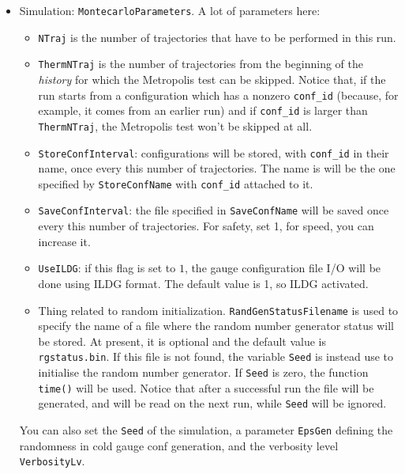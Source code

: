 \begin{itemize}
\item{Simulation: \verb|MontecarloParameters|.} A lot of parameters here: 
\begin{itemize}
\item \verb|NTraj| is the number of trajectories that have to be performed in 
    this run.
\item \verb|ThermNTraj| is the number of trajectories from the beginning of the 
    \emph{history} for which the Metropolis test can be skipped. Notice that, 
if 
    the run starts from a configuration which has a nonzero \verb|conf_id| 
    (because, for example, it comes from an earlier run) and if \verb|conf_id| 
is 
    larger than \verb|ThermNTraj|, the Metropolis test won't be skipped at all.
\item \verb|StoreConfInterval|: configurations will be stored, with 
    \verb|conf_id| in their name, once every this number of trajectories. The 
name 
    is will be the one specified by \verb|StoreConfName| with \verb|conf_id| 
    attached to it. 
\item \verb|SaveConfInterval|: the file specified in \verb|SaveConfName| will 
    be saved once every this number of trajectories. For safety, set 1, for 
speed, 
    you can increase it.
\item \verb|UseILDG|: if this flag is set to $1$, the gauge configuration file 
    I/O will be done using ILDG format. The default value is 1, 
so ILDG activated.
\item Thing related to random initialization. \verb|RandGenStatusFilename| is 
used to specify the name of a file where the random number generator status 
will be stored. At present, it is optional and the default value is 
\verb|rgstatus.bin|. If this file is not found, the variable \verb|Seed| is 
instead use to initialise the random number generator. If \verb|Seed| is zero, 
the function \verb|time()| will be used. Notice that after a successful run 
the file will be generated, and will be read on the next run, while \verb|Seed| 
will be ignored.
\end{itemize}
You can also set the \verb|Seed| of the simulation, 
a parameter 
\verb|EpsGen| defining the randomness in cold gauge conf generation, and the 
verbosity level \verb|VerbosityLv|. 


\end{itemize}
